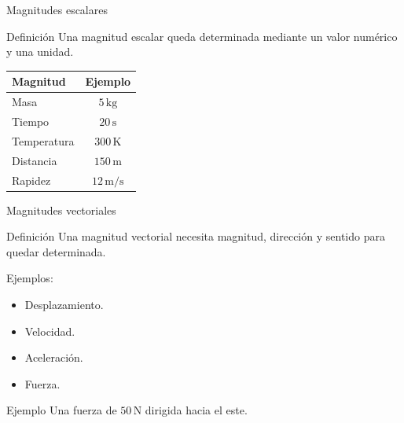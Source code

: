 \documentclass[aspectratio=169,11pt]{beamer}
\begin{document}
\begin{frame}{Magnitudes escalares}

\begin{block}{Definición}
Una magnitud escalar queda
determinada mediante un valor
numérico y una unidad.
\end{block}

\begin{center}
\renewcommand{\arraystretch}{1.4}
\begin{tabular}{|l|c|}
\hline
Magnitud & Ejemplo\\
\hline
Masa & \(5\,\mathrm{kg}\)\\
\hline
Tiempo & \(20\,\mathrm{s}\)\\
\hline
Temperatura & \(300\,\mathrm{K}\)\\
\hline
Distancia & \(150\,\mathrm{m}\)\\
\hline
Rapidez & \(12\,\mathrm{m/s}\)\\
\hline
\end{tabular}
\end{center}

\end{frame}

\begin{frame}{Magnitudes vectoriales}

\begin{block}{Definición}
Una magnitud vectorial necesita
magnitud, dirección y sentido
para quedar determinada.
\end{block}

Ejemplos:

\begin{itemize}
\item Desplazamiento.
\item Velocidad.
\item Aceleración.
\item Fuerza.
\end{itemize}

\begin{exampleblock}{Ejemplo}
Una fuerza de \(50\,\mathrm{N}\)
dirigida hacia el este.
\end{exampleblock}

\end{frame}
\end{document}
